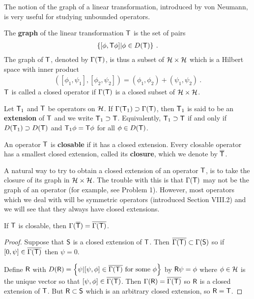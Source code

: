 The notion of the graph of a linear transformation, introduced by von Neumann, is very useful for studying unbounded operators.

\begin{definition}
The \textbf{graph} of the linear transformation $\mathsf{T}$ is the set of pairs
\begin{align}
    \left \lbrace [\phi, \mathsf{T} \phi] | \phi \in D(\mathsf{T}) \right \rbrace \:.
\end{align}
The graph of $\mathsf{T}$, denoted by $\Gamma(\mathsf{T})$, is thus a subset of $\mathcal{H} \times \mathcal{H}$ which is a Hilbert space with inner product \begin{align}
    \left([\phi_1, \psi_1], [\phi_2, \psi_2] \right) = (\phi_1, \phi_2) + (\psi_1, \psi_2) \:.
\end{align}
$\mathsf{T}$ is called a closed operator if $\Gamma(\mathsf{T})$ is a closed subset of $\mathcal{H} \times \mathcal{H}$.
\end{definition}

\begin{definition}
    Let $\mathsf{T}_1$ and $\mathsf{T}$ be operators on $\mathcal{H}$. If $\Gamma(\mathsf{T}_1) \supset \Gamma(\mathsf{T})$, then $\mathsf{T}_1$ is said to be an \textbf{extension }of $\mathsf{T}$ and we write $\mathsf{T}_1 \supset \mathsf{T}$. Equivalently, $\mathsf{T}_1 \supset \mathsf{T}$ if and only if $D(\mathsf{T}_1) \supset D(\mathsf{T})$ and $\mathsf{T}_1 \phi = \mathsf{T} \phi$ for all $\phi \in D(\mathsf{T})$.
\end{definition}

\begin{definition}
An operator $\mathsf{T}$ is \textbf{closable} if it has a closed extension. Every closable operator has a smallest closed extension, called its \textbf{closure}, which we denote by $\overline{\mathsf{T}}$.   
\end{definition}


A natural way to try to obtain a closed extension of an operator $\mathsf{T}$, is to take the closure of its graph in $\mathcal{H} \times \mathcal{H}$. The trouble with this is that $\Gamma(\mathsf{T})$ may not be the graph of an operator (for example, see Problem 1). However, most operators which we deal with will be symmetric operators (introduced Section VIII.2) and we will see that they always have closed extensions.

\begin{preposition}
If $\mathsf{T}$ is closable, then $\Gamma(\overline{\mathsf{T}}) = \overline{\Gamma(\mathsf{T})}$.
\end{preposition}

\begin{proof}
Suppose that $\mathsf{S}$ is a closed extension of $\mathsf{T}$. Then $\overline{\Gamma(\mathsf{T})} \subset \Gamma(\mathsf{S})$ so if $[0, \psi] \in \overline{\Gamma(\mathsf{T})}$ then $\psi = 0$.  

Define $\mathsf{R}$ with $D(\mathsf{R}) = \left \lbrace \psi | [\psi, \phi] \in \overline{\Gamma(\mathsf{T})} \text{ for some } \phi \right \rbrace$ by $\mathsf{R} \psi = \phi$ where $\phi \in \mathcal{H}$ is the unique vector so that $[\psi, \phi] \in \overline{\Gamma(\mathsf{T})}$. Then
$\Gamma(\mathsf{R}) = \overline{\Gamma(\mathsf{T})}$ so $\mathsf{R}$ is a closed extension of $\mathsf{T}$. But $\mathsf{R} \subset \mathsf{S}$ which is an arbitrary
closed extension, so $\mathsf{R}= \mathsf{T}$.
\end{proof}

